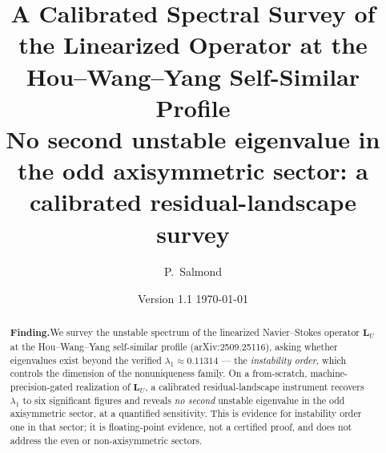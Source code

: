 \documentclass[11pt]{article}
\title{\bfseries A Calibrated Spectral Survey of the Linearized Operator
at the Hou--Wang--Yang Self-Similar Profile\\[0.3em]
\large\mdseries No second unstable eigenvalue in the odd
axisymmetric sector: a calibrated residual-landscape survey}
\author{P.~Salmond}
\date{Version 1.1 \textemdash{} \today}
\newcommand{\LU}{\mathbf{L}_{U}}
\theoremstyle{plain}
\theoremstyle{remark}
\begin{document}
\maketitle
\thispagestyle{empty}

\begin{abstract}
\noindent\textbf{Finding.}\enspace We survey the unstable spectrum of
the linearized Navier--Stokes operator $\LU$ at the Hou--Wang--Yang
self-similar profile (arXiv:2509.25116), asking whether eigenvalues
exist beyond the verified $\lambda_1\approx 0.11314$ --- the
\emph{instability order}, which controls the dimension of the
nonuniqueness family. On a from-scratch, machine-precision-gated
realization of $\LU$, a calibrated residual-landscape instrument
recovers $\lambda_1$ to six significant figures and reveals \emph{no
second} unstable eigenvalue in the odd axisymmetric sector, at a
quantified sensitivity. This is evidence for instability order one in
that sector; it is floating-point evidence, not a certified proof, and
does not address the even or non-axisymmetric sectors.


\end{abstract}
\end{document}
